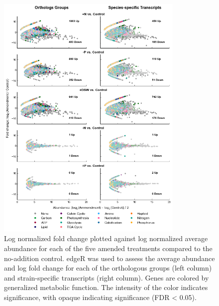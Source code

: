 \begin{figure}[p!]
  \centering
    \includegraphics[width=0.8\textwidth]{Images/C6_FigureS4_MANTA.png}
    \caption[Log normalized fold change plotted against log normalized average abundance for each of the five amended treatments compared to the no-addition control]{Log normalized fold change plotted against log normalized average abundance for each of the five amended treatments compared to the no-addition control. edgeR was used to assess the average abundance and log fold change for each of the orthologous groups (left column) and strain-specific transcripts (right column). Genes are colored by generalized metabolic function. The intensity of the color indicates significance, with opaque indicating significance (FDR < 0.05). }
    \label{fig:a5f4}
\end{figure}



